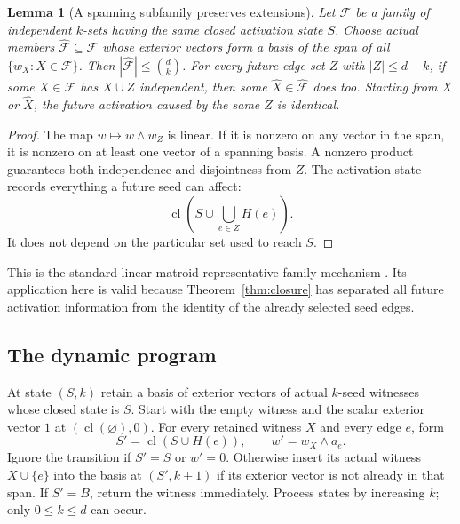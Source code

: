 \documentclass[11pt,letterpaper]{article}
\newtheorem{lemma}[theorem]{Lemma}
\theoremstyle{definition}
\newcommand{\cl}{\operatorname{cl}}
\begin{document}
\begin{lemma}[A spanning subfamily preserves extensions]\label{lem:rep}
Let $\mathcal F$ be a family of independent $k$-sets having the same closed
activation state $S$. Choose actual members $\widehat{\mathcal F}\subseteq
\mathcal F$ whose exterior vectors form a basis of the span of all
$\{w_X:X\in\mathcal F\}$. Then
$|\widehat{\mathcal F}|\leq\binom dk$. For every future edge set $Z$ with
$|Z|\leq d-k$, if some $X\in\mathcal F$ has $X\cup Z$ independent,
then some $\widehat X\in\widehat{\mathcal F}$ does too. Starting from
$X$ or $\widehat X$, the future activation caused by the same $Z$ is identical.
\end{lemma}
\begin{proof}
The map $w\mapsto w\wedge w_Z$ is linear. If it is nonzero on any vector
in the span, it is nonzero on at least one vector of a spanning basis.
A nonzero product guarantees both independence and disjointness from $Z$.
The activation state records everything a future seed can affect:
\[
 \cl\left(S\cup\bigcup_{e\in Z}H(e)\right).
\]
It does not depend on the particular set used to reach $S$.
\end{proof}
This is the standard linear-matroid representative-family mechanism
\cite{fomin}. Its application here is valid because
Theorem~\ref{thm:closure} has separated all future activation information
from the identity of the already selected seed edges.

\subsection{The dynamic program}
At state $(S,k)$ retain a basis of exterior vectors of actual $k$-seed
witnesses whose closed state is $S$. Start with the empty witness and the
scalar exterior vector $1$ at $(\cl(\varnothing),0)$. For every retained
witness $X$ and every edge $e$, form
\begin{equation}\label{eq:transition}
 S'=\cl(S\cup H(e)),\qquad w'=w_X\wedge a_e.
\end{equation}
Ignore the transition if $S'=S$ or $w'=0$. Otherwise insert its actual
witness $X\cup\{e\}$ into the basis at $(S',k+1)$ if its exterior vector
is not already in that span. If $S'=B$, return the witness immediately.
Process states by increasing $k$; only $0\leq k\leq d$ can occur.
\end{document}
